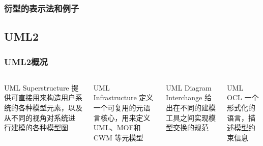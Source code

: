 \documentclass[compress]{beamer}
\begin{document}
\begin{frame}
  \frametitle{衍型的表示法和例子}


\end{frame}

\subsection{UML2}

\begin{frame}
  \frametitle{UML2概况}
  \begin{columns}[t]
    \column{0.6\hsize}
    \begin{block}{UML Superstructure}
      提供可直接用来构造用户系统的各种模型元素，以及从不同的视角对系统进
      行建模的各种模型图
    \end{block}
    \begin{block}{UML Infrastructure}
      定义一个可复用的元语言核心，用来定义UML、MOF和CWM
      等元模型 
    \end{block}
    \column{0.4\hsize}
    \begin{block}{UML Diagram Interchange}
      给出在不同的建模工具之间实现模型交换的规范
    \end{block}
    \begin{block}{UML OCL}
      一个形式化的语言，描述模型约束信息 \\

    \end{block}
  \end{columns}
\end{frame}
\end{document}
